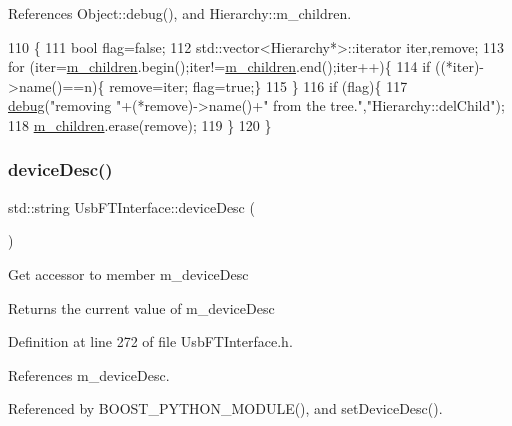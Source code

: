 References Object\+::debug(), and Hierarchy\+::m\+\_\+children.


\begin{DoxyCode}
110                                    \{
111   \textcolor{keywordtype}{bool} flag=\textcolor{keyword}{false};
112   std::vector<Hierarchy*>::iterator iter,\textcolor{keyword}{remove};
113   \textcolor{keywordflow}{for} (iter=\hyperlink{classHierarchy_a038816763941fd4a930504917f60483b}{m\_children}.begin();iter!=\hyperlink{classHierarchy_a038816763941fd4a930504917f60483b}{m\_children}.end();iter++)\{
114     \textcolor{keywordflow}{if} ((*iter)->name()==n)\{ \textcolor{keyword}{remove}=iter; flag=\textcolor{keyword}{true};\}
115   \}
116   \textcolor{keywordflow}{if} (flag)\{
117     \hyperlink{classObject_aac010553f022165573714b7014a15f0d}{debug}(\textcolor{stringliteral}{"removing "}+(*remove)->name()+\textcolor{stringliteral}{" from the tree."},\textcolor{stringliteral}{"Hierarchy::delChild"});
118     \hyperlink{classHierarchy_a038816763941fd4a930504917f60483b}{m\_children}.erase(\textcolor{keyword}{remove});
119   \}
120 \}
\end{DoxyCode}
\mbox{\label{classUsbFTInterface_af353796fd68a869ea5c8e753aa65dc2c}} 
\subsubsection{\texorpdfstring{device\+Desc()}{deviceDesc()}}
{\footnotesize\ttfamily std\+::string Usb\+F\+T\+Interface\+::device\+Desc (\begin{DoxyParamCaption}{ }\end{DoxyParamCaption})\hspace{0.3cm}{\ttfamily [inline]}}

Get accessor to member m\+\_\+device\+Desc \begin{DoxyReturn}{Returns}
the current value of m\+\_\+device\+Desc 
\end{DoxyReturn}


Definition at line 272 of file Usb\+F\+T\+Interface.\+h.



References m\+\_\+device\+Desc.



Referenced by B\+O\+O\+S\+T\+\_\+\+P\+Y\+T\+H\+O\+N\+\_\+\+M\+O\+D\+U\+L\+E(), and set\+Device\+Desc().


